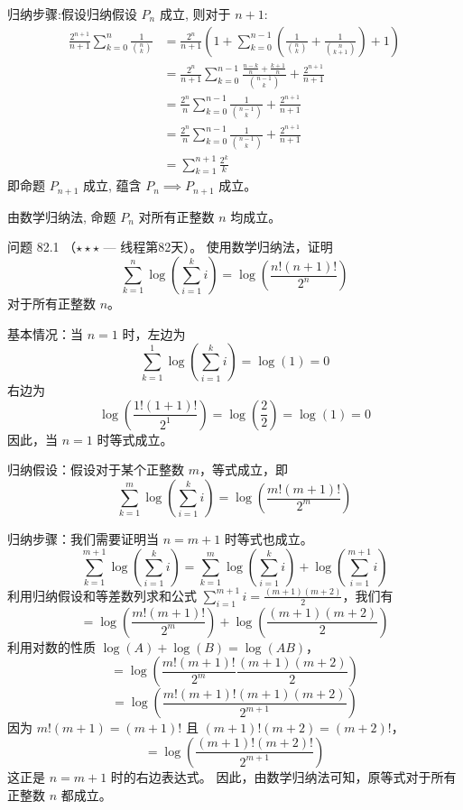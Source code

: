 \begin{questions}
\begin{solution}
        归纳步骤:假设归纳假设 $P_n$ 成立, 则对于 $n+1$:
        \begin{align*}
        \frac{2^{n+1}}{n+1} \sum_{k=0}^{n} \frac{1}{\binom{n}{k}} 
        &= \frac{2^n}{n+1} \left( 1 + \sum_{k=0}^{n-1} \left( \frac{1}{\binom{n}{k}} + \frac{1}{\binom{n}{k+1}} \right) + 1 \right) \\
        &= \frac{2^n}{n+1} \sum_{k=0}^{n-1} \frac{\frac{n-k}{n}+\frac{k+1}{n}}{\binom{n-1}{k}} + \frac{2^{n+1}}{n+1} \\
        &= \frac{2^n}{n} \sum_{k=0}^{n-1} \frac{1}{ \binom{n-1}{k}} + \frac{2^{n+1}}{n+1} \\
        &= \frac{2^n}{n} \sum_{k=0}^{n-1} \frac{1}{\binom{n-1}{k}} + \frac{2^{n+1}}{n+1} \\
        &= \sum_{k=1}^{n+1} \frac{2^k}{k}
        \end{align*}
        即命题 $P_{n+1}$ 成立, 蕴含 $P_n \implies P_{n+1}$ 成立。

        由数学归纳法, 命题 $P_n$ 对所有正整数 $n$ 均成立。
    \end{solution}

    \question
问题 82.1 （$\star\star\star$ — 线程第82天）。
使用数学归纳法，证明
\[
\sum_{k=1}^n \log\left( \sum_{i=1}^k i \right) = \log\left( \frac{n!(n+1)!}{2^n} \right)
\]
对于所有正整数 $n$。
\begin{solution}
基本情况：当 $n=1$ 时，左边为
\[
\sum_{k=1}^1 \log\left( \sum_{i=1}^k i \right) = \log(1) = 0
\]
右边为
\[
\log\left( \frac{1!(1+1)!}{2^1} \right) = \log\left( \frac{2}{2} \right) = \log(1) = 0
\]
因此，当 $n=1$ 时等式成立。

归纳假设：假设对于某个正整数 $m$，等式成立，即
\[
\sum_{k=1}^m \log\left( \sum_{i=1}^k i \right) = \log\left( \frac{m!(m+1)!}{2^m} \right)
\]

归纳步骤：我们需要证明当 $n=m+1$ 时等式也成立。
\[
\sum_{k=1}^{m+1} \log\left( \sum_{i=1}^k i \right) = \sum_{k=1}^m \log\left( \sum_{i=1}^k i \right) + \log\left( \sum_{i=1}^{m+1} i \right)
\]
利用归纳假设和等差数列求和公式 $\sum_{i=1}^{m+1} i = \frac{(m+1)(m+2)}{2}$，我们有
\[
= \log\left( \frac{m!(m+1)!}{2^m} \right) + \log\left( \frac{(m+1)(m+2)}{2} \right)
\]
利用对数的性质 $\log(A) + \log(B) = \log(AB)$，
\[
= \log\left( \frac{m!(m+1)!}{2^m} \frac{(m+1)(m+2)}{2} \right)
\]
\[
= \log\left( \frac{m!(m+1)! (m+1)(m+2)}{2^{m+1}} \right)
\]
因为 $m!(m+1) = (m+1)!$ 且 $(m+1)!(m+2) = (m+2)!$，
\[
= \log\left( \frac{(m+1)!(m+2)!}{2^{m+1}} \right)
\]
这正是 $n=m+1$ 时的右边表达式。
因此，由数学归纳法可知，原等式对于所有正整数 $n$ 都成立。
\end{solution}


\end{questions}
